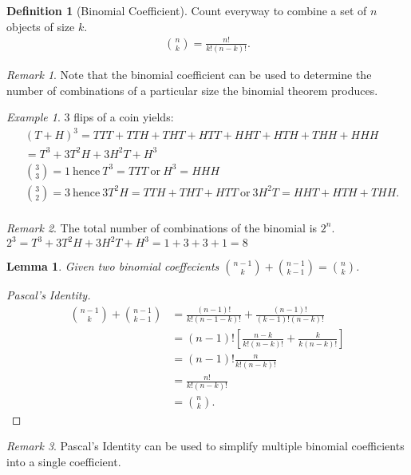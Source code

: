 \documentclass{article}
\theoremstyle{plain}
\newtheorem{lemma}{Lemma}
\theoremstyle{definition}
\newtheorem{definition}{Definition}
\theoremstyle{remark}
\newtheorem{remark}{Remark}
\newtheorem{example}{Example}
\begin{document}
\begin{definition}[Binomial Coefficient]
  Count everyway to combine a set of $n$ objects of size $k$.
  \begin{align*}
    \binom{n}{k} = \frac{n!}{k!(n-k)!}.
  \end{align*}
\end{definition}
\begin{remark}
  Note that the binomial coefficient can be used to determine the number of combinations of a particular size the binomial theorem produces.
\end{remark}
\begin{example}
  3 flips of a coin yields:
  \begin{align*}
  &(T + H)^3 = TTT + TTH + THT + HTT + HHT+ HTH + THH + HHH \\
  &= T^3 + 3T^2H + 3H^2T + H^3 \\
  &\binom{3}{3} = 1\ \text{hence}\ T^3 = TTT\ \text{or}\ H^3 = HHH \\
  &\binom{3}{2} = 3\ \text{hence}\ 3T^2H = TTH + THT + HTT\ \text{or}\ 3H^2T = HHT+HTH+THH. \\
  \end{align*}
\end{example}
\begin{remark}
  The total number of combinations of the binomial is $2^n$. \\
  $2^3 = T^3 + 3T^2H + 3H^2T + H^3 = 1 + 3 + 3 + 1 = 8$
\end{remark}
\begin{lemma}
  Given two binomial coeffecients $\binom{n-1}{k} + \binom{n-1}{k-1} = \binom{n}{k}$.
\end{lemma}
\begin{proof}[Pascal's Identity]
  \begin{align*}
    \binom{n - 1}{k} + \binom{n - 1}{k - 1} &= \frac{(n-1)!}{k!(n - 1 - k)!} + \frac{(n - 1)!}{(k-1)!(n-k)!} \\
    &= (n - 1)![\frac{n-k}{k!(n-k)!} + \frac{k}{k(n-k)!}] \\
    &= (n - 1)!\frac{n}{k!(n-k)!} \\
    &= \frac{n!}{k!(n - k)!} \\
    &= \binom{n}{k}.
  \end{align*}
\end{proof}
\begin{remark}
 Pascal's Identity can be used to simplify multiple binomial coefficients into a single coefficient.
\end{remark}
\end{document}

